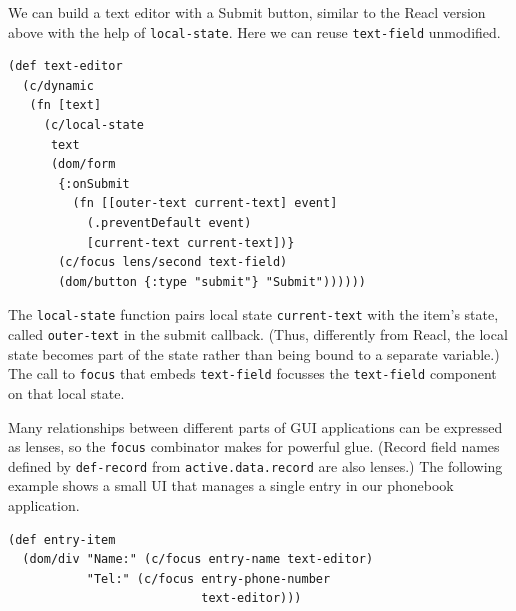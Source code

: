 \documentclass[sigplan,screen]{acmart}
\begin{document}
We can build a text editor with a Submit button, similar to the Reacl
version above with the help of \texttt{local-state}. Here we can reuse
\texttt{text-field} unmodified.
%
\begin{verbatim}
(def text-editor
  (c/dynamic
   (fn [text]
     (c/local-state
      text
      (dom/form
       {:onSubmit
         (fn [[outer-text current-text] event]
           (.preventDefault event)
           [current-text current-text])}
       (c/focus lens/second text-field)
       (dom/button {:type "submit"} "Submit"))))))
\end{verbatim}
%
The \texttt{local-state} function pairs local state \texttt{current-text}
with the item's state, called \texttt{outer-text} in the submit
callback.  (Thus, differently from Reacl, the local state becomes part
of the state rather than being bound to a separate variable.)  The
call to \texttt{focus} that embeds \texttt{text-field} focusses the
\texttt{text-field} component on that local state.
%
\begin{center}
\end{center}
%
Many relationships between different parts of GUI applications can be
expressed as lenses, so the \texttt{focus} combinator makes for 
powerful glue.  (Record field names defined by \texttt{def-record} from
\texttt{active.data.record} are also lenses.) The following
example shows a small UI that manages a single entry in our phonebook
application.
%
\begin{verbatim}
(def entry-item
  (dom/div "Name:" (c/focus entry-name text-editor)
           "Tel:" (c/focus entry-phone-number
                           text-editor)))
\end{verbatim}
%
\begin{center}
\end{center}
\end{document}
